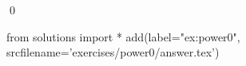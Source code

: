 
\begin{ex} 
  \label{ex:power0}
  
  \qed
\end{ex} 
\begin{python0}
from solutions import *
add(label="ex:power0",
    srcfilename='exercises/power0/answer.tex') 
\end{python0}
